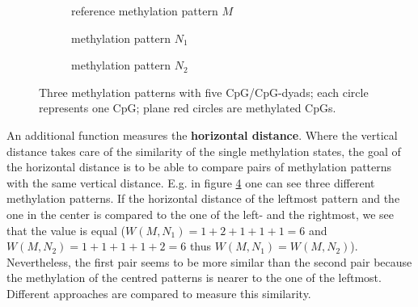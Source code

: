 \begin{figure}[h]
\begin{subfigure}{\textwidth}
\centering
{}
\label{sfig:0}
\caption{reference methylation pattern $M$}
\end{subfigure}
\begin{subfigure}{\textwidth}
\centering
{}
\label{sfig:1}
\caption{methylation pattern $N_1$}
\end{subfigure}
\begin{subfigure}{\textwidth}
\centering
{}
\label{sfig:2}
\caption{methylation pattern $N_2$}
\end{subfigure}
\caption{Three methylation patterns with five CpG/CpG-dyads; each circle represents one CpG; plane red circles are methylated CpGs.}
\label{fig:horizontal}
\end{figure}
An additional function measures the \textbf{horizontal distance}. Where the vertical distance takes care of the similarity of the single methylation states, the goal of the horizontal distance is to be able to compare pairs of methylation patterns with the same vertical distance. E.g. in figure \ref{fig:horizontal} one can see three different methylation patterns. If the horizontal distance of the leftmost pattern and the one in the center is compared to the one of the left- and the rightmost, we see that the value is equal ($W(M,N_1)=1+2+1+1+1=6$ and $W(M,N_2)=1+1+1+1+2=6$ thus $W(M,N_1)=W(M,N_2)$). Nevertheless, the first pair seems to be more similar than the second pair because the methylation of the centred patterns is nearer to the one of the leftmost. Different approaches are compared to measure this similarity.\\

